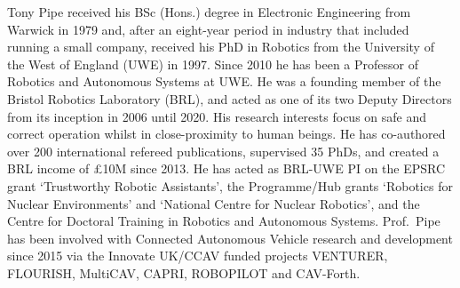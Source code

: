 \documentclass[letterpaper, 10 pt, journal, twoside]{IEEEtran}
\begin{document}
\begin{IEEEbiography}{Tony Pipe} 
received his BSc (Hons.) degree in Electronic Engineering from Warwick in 1979 and, after an eight-year period in industry that included running a small company, received his PhD in Robotics from the University of the West of England (UWE) in 1997. Since 2010 he has been a Professor of Robotics and Autonomous Systems at UWE. He was a founding member of the Bristol Robotics Laboratory (BRL), and acted as one of its two Deputy Directors from its inception in 2006 until 2020. His research interests focus on safe and correct operation whilst in close-proximity to human beings. He has co-authored over 200 international refereed publications, supervised 35 PhDs, and created a BRL income of \pounds10M since 2013. He has acted as BRL-UWE PI on the EPSRC grant ‘Trustworthy Robotic Assistants’, the Programme/Hub grants ‘Robotics for Nuclear Environments’ and ‘National Centre for Nuclear Robotics’, and the Centre for Doctoral Training in Robotics and Autonomous Systems. Prof.\ Pipe has been involved with Connected Autonomous Vehicle research and development since 2015 via the Innovate UK/CCAV funded projects VENTURER, FLOURISH, MultiCAV, CAPRI, ROBOPILOT and CAV-Forth.
\end{IEEEbiography}
\end{document}
